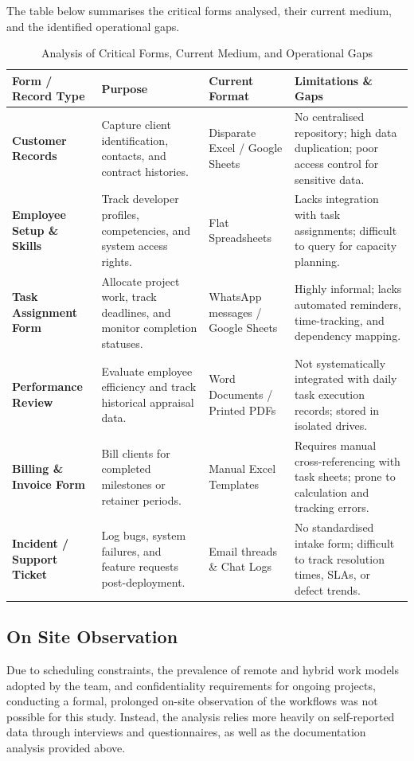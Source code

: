 \documentclass[12pt,a4paper]{report}
\begin{document}
The table below summarises the critical forms analysed, their current medium, and the identified operational gaps.

\begin{table}[H]
\centering
\renewcommand{\arraystretch}{1.35}
\small
\begin{tabularx}{\textwidth}{|p{2.6cm}|X|p{2.3cm}|X|}
\hline
\rowcolor{secondary}
\textbf{Form / Record Type} & \textbf{Purpose} & \textbf{Current Format} & \textbf{Limitations \& Gaps} \\
\hline
\textbf{Customer Records} & Capture client identification, contacts, and contract histories. & Disparate Excel / Google Sheets & No centralised repository; high data duplication; poor access control for sensitive data. \\
\hline
\textbf{Employee Setup \& Skills} & Track developer profiles, competencies, and system access rights. & Flat Spreadsheets & Lacks integration with task assignments; difficult to query for capacity planning. \\
\hline
\textbf{Task Assignment Form} & Allocate project work, track deadlines, and monitor completion statuses. & WhatsApp messages / Google Sheets & Highly informal; lacks automated reminders, time-tracking, and dependency mapping. \\
\hline
\textbf{Performance Review} & Evaluate employee efficiency and track historical appraisal data. & Word Documents / Printed PDFs & Not systematically integrated with daily task execution records; stored in isolated drives. \\
\hline
\textbf{Billing \& Invoice Form} & Bill clients for completed milestones or retainer periods. & Manual Excel Templates & Requires manual cross-referencing with task sheets; prone to calculation and tracking errors. \\
\hline
\textbf{Incident / Support Ticket} & Log bugs, system failures, and feature requests post-deployment. & Email threads \& Chat Logs & No standardised intake form; difficult to track resolution times, SLAs, or defect trends. \\
\hline
\end{tabularx}
\caption{Analysis of Critical Forms, Current Medium, and Operational Gaps}
\end{table}

\subsection{On Site Observation}
Due to scheduling constraints, the prevalence of remote and hybrid work models adopted by the team, and confidentiality requirements for ongoing projects, conducting a formal, prolonged on-site observation of the workflows was not possible for this study. Instead, the analysis relies more heavily on self-reported data through interviews and questionnaires, as well as the documentation analysis provided above.
\end{document}
